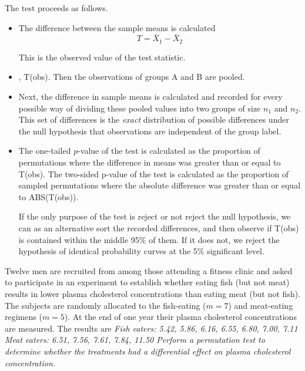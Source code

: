 The test proceeds as follows. 
\begin{itemize}
\item
The difference between the sample means is calculated
$$
T = \bar{X}_1 - \bar{X}_2
$$

This is the observed value of the test statistic.
\item , T(obs). Then the observations of groups A and B are pooled.
\item
Next, the difference in sample means is calculated and recorded for every possible way of dividing these pooled values into two groups of size $n_1$ and $n_2$. This set of differences is the \emph{exact} distribution of possible differences under the null hypothesis that observations are independent of the group label.
\item
The one-tailed $p$-value of the test is calculated as the proportion of permutations where the difference in means was greater than or equal to T(obs). The two-sided p-value of the test is calculated as the proportion of sampled permutations where the absolute difference was greater than or equal to ABS(T(obs)).

If the only purpose of the test is reject or not reject the null hypothesis, we can as an alternative sort the recorded differences, and then observe if T(obs) is contained within the middle 95\% of them. If it does not, we reject the hypothesis of identical probability curves at the 5\% significant level.
\end{itemize}

\begin{example}
Twelve men are recruited from among those attending a fitness clinic and asked to participate in an experiment to establish whether eating fish (but not meat) results in lower plasma cholesterol concentrations than eating meat (but not fish). The subjects are randomly allocated to the fish-eating ($m=7$) and meat-eating regimens ($m= 5$). At the end of one year their plasma cholesterol concentrations are measured. The results are
\bit
\it Fish eaters: 5.42, 5.86, 6.16, 6.55, 6.80, 7.00, 7.11
\it Meat eaters: 6.51, 7.56, 7.61, 7.84, 11.50 
\eit
Perform a permutation test to determine whether the treatments had a differential effect on plasma cholesterol concentration. 
\end{example}

